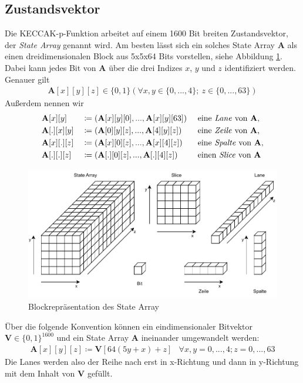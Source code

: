 \subsection{Zustandsvektor}
Die KECCAK-p-Funktion arbeitet auf einem 1600 Bit breiten Zustandsvektor, der \textit{State Array} genannt wird.
Am besten lässt sich ein solches State Array \textbf{A} als einen dreidimensionalen Block aus 5x5x64 Bits vorstellen, siehe Abbildung \ref{fig:statearray}.
Dabei kann jedes Bit von \textbf{A} über die drei Indizes $x$, $y$ und $z$ identifiziert werden.
Genauer gilt
\begin{align*}
    \textbf{A}[x][y][z] \in \{0,1\} (\forall x, y \in \{0,...,4\};\ z \in \{0,...,63\})
\end{align*}
Außerdem nennen wir
\begin{align*}
    & \textbf{A}[x][y] && \coloneq (\textbf{A}[x][y][0], ... , \textbf{A}[x][y][63]) && \text{ eine \textit{Lane} von \textbf{A},} \\
    & \textbf{A}[.][x][y] && \coloneq (\textbf{A}[0][y][z], ... , \textbf{A}[4][y][z]) && \text{ eine \textit{Zeile} von \textbf{A},} \\
    & \textbf{A}[x][.][z] && \coloneq (\textbf{A}[x][0][z], ... , \textbf{A}[x][4][z]) && \text{ eine \textit{Spalte} von \textbf{A},} \\
    & \textbf{A}[.][.][z] && \coloneq (\textbf{A}[.][0][z], ... , \textbf{A}[.][4][z]) && \text{ einen \textit{Slice} von \textbf{A}}
\end{align*}
\begin{figure}
	\center
	\includegraphics{images/StateArrayBeschreibung.pdf}
	\caption{Blockrepräsentation des State Array}
	\label{fig:statearray}
\end{figure}
Über die folgende Konvention können ein eindimensionaler Bitvektor $\textbf{V} \in \{0,1\}^{1600}$ und ein State Array \textbf{A} ineinander umgewandelt werden:
\begin{align*}
	\textbf{A}[x][y][z] \coloneq \textbf{V}[64(5y + x) + z] & \forall x,y = 0,...,4; z = 0,...,63
\end{align*}
Die Lanes werden also der Reihe nach erst in x-Richtung und dann in y-Richtung mit dem Inhalt von \textbf{V} gefüllt.

